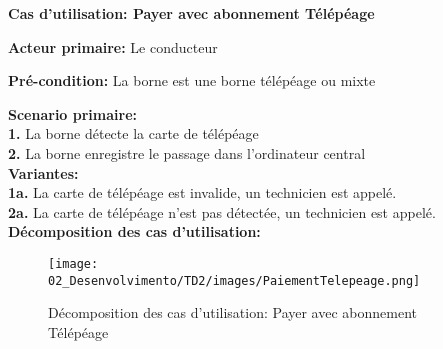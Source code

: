 \textbf{Cas d'utilisation: Payer avec abonnement Télépéage}

\textbf{Acteur primaire:} Le conducteur


\textbf{Pré-condition: }  La borne est une borne télépéage ou mixte
 

\textbf{Scenario primaire: } \\
    \textbf{1.} La borne détecte la carte de télépéage\\
    \textbf{2.} La borne enregistre le passage dans l’ordinateur central\\

\textbf{Variantes:}\\
    \textbf{1a. }La carte de télépéage est invalide, un technicien est appelé.\\

    \textbf{2a.} La carte de télépéage n’est pas détectée, un technicien est appelé.\\



\textbf{Décomposition des cas d'utilisation:} 
\begin{figure}[h]
    \centering
    \texttt{[image: 02\_Desenvolvimento/TD2/images/PaiementTelepeage.png]}
    \caption{Décomposition des cas d'utilisation: Payer avec abonnement Télépéage}
\end{figure}